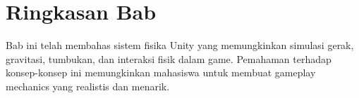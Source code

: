 \section{Ringkasan Bab}

Bab ini telah membahas sistem fisika Unity yang memungkinkan simulasi gerak, gravitasi, tumbukan, dan interaksi fisik dalam game. Pemahaman terhadap konsep-konsep ini memungkinkan mahasiswa untuk membuat gameplay mechanics yang realistis dan menarik.
